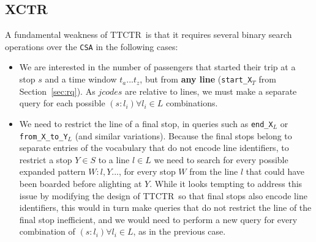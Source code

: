 \documentclass[runningheads]{llncs}
\newcommand{\ctr}{XCTR}
\newcommand{\ttctr}{TTCTR}
\begin{document}
\subsection{\ctr}
\label{sec:ctr}
A fundamental weakness of \ttctr~is that it requires several binary search operations over the \texttt{CSA} in the following cases:
\begin{itemize}
    \item We are interested in the number of passengers that started their trip at a stop $s$ and a time window $t_a...t_z$, but from \textbf{any line} (\texttt{start\_X$_{T}$} from Section~\ref{sec:rq}). As $jcodes$ are relative to lines, we must make a separate query for each possible $(s:l_i) \forall l_i \in L$ combinations.
    \item We need to restrict the line of a final stop, in queries such as \texttt{end\_X$_{L}$} or \texttt{from\_X\_to\_Y$_{L}$} (and similar variations). Because the final stops belong to separate entries of the vocabulary that do not encode line identifiers, to restrict a stop $Y\in S$ to a line $l\in L$ we need to search for every possible expanded pattern $W:l,Y...$, for every stop $W$ from the line $l$ that could have been boarded before alighting at $Y$. While it looks tempting to address this issue by modifying the design of \ttctr~so that final stops also encode line identifiers, this would in turn make queries that do not restrict the line of the final stop inefficient, and we would need to perform a new query for every combination of $(s:l_i) \forall l_i \in L$, as in the previous case. 
\end{itemize}
\end{document}
